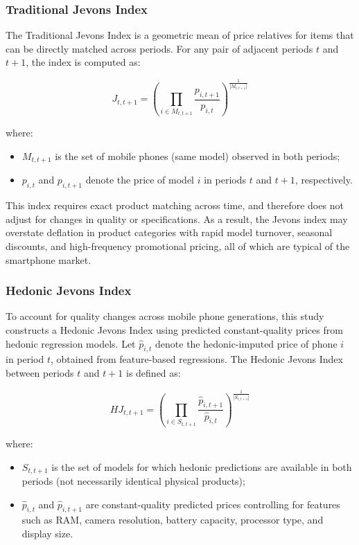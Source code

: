 \documentclass[12pt]{article}
\begin{document}
\subsubsection{Traditional Jevons Index}

The Traditional Jevons Index is a geometric mean of price relatives for items that can be directly matched across periods. For any pair of adjacent periods $t$ and $t+1$, the index is computed as:

\begin{equation}
J_{t,t+1} = 
\left(
\prod_{i \in M_{t,t+1}}
\frac{p_{i,t+1}}{p_{i,t}}
\right)^{\frac{1}{|M_{t,t+1}|}}
\end{equation}

where:
\begin{itemize}
    \item $M_{t,t+1}$ is the set of mobile phones (same model) observed in both periods;
    \item $p_{i,t}$ and $p_{i,t+1}$ denote the price of model $i$ in periods $t$ and $t+1$, respectively.
\end{itemize}

This index requires exact product matching across time, and therefore does not adjust for changes in quality or specifications. As a result, the Jevons index may overstate deflation in product categories with rapid model turnover, seasonal discounts, and high-frequency promotional pricing, all of which are typical of the smartphone market.

\subsubsection{Hedonic Jevons Index}

To account for quality changes across mobile phone generations, this study constructs a Hedonic Jevons Index using predicted constant-quality prices from hedonic regression models. Let $\hat{p}_{i,t}$ denote the hedonic-imputed price of phone $i$ in period $t$, obtained from feature-based regressions. The Hedonic Jevons Index between periods $t$ and $t+1$ is defined as:

\begin{equation}
HJ_{t,t+1} = 
\left(
\prod_{i \in S_{t,t+1}}
\frac{\hat{p}_{i,t+1}}{\hat{p}_{i,t}}
\right)^{\frac{1}{|S_{t,t+1}|}}
\end{equation}

where:
\begin{itemize}
    \item $S_{t,t+1}$ is the set of models for which hedonic predictions are available in both periods (not necessarily identical physical products);
    \item $\hat{p}_{i,t}$ and $\hat{p}_{i,t+1}$ are constant-quality predicted prices controlling for features such as RAM, camera resolution, battery capacity, processor type, and display size.
\end{itemize}
\end{document}
